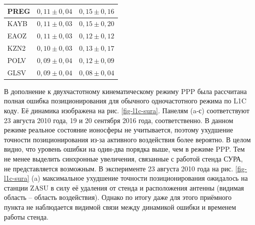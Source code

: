 \begin{longtable}{|>{\centering\arraybackslash}m{4cm}|c|c|}
PREG    & $0,11\pm0,04$                                                                                       & $0,15\pm0,16$                                                                                    \\ \hline
KAYB    & $0,11\pm0,03$                                                                                       & $0,15\pm0,20$                                                                                    \\ \hline
EAOZ    & $0,11\pm0,03$                                                                                       & $0,12\pm0,12$                                                                                    \\ \hline
KZN2    & $0,10\pm0,03$                                                                                       & $0,13\pm0,17$                                                                                    \\ \hline
POLV    & $0,09\pm0,04$                                                                                       & $0,12\pm0,09$                                                                                    \\ \hline
GLSV    & $0,09\pm0,04$                                                                                       & $0,08\pm0,04$                                                                                    \\ \hline
\end{longtable}
\endgroup

В дополнение к двухчастотному кинематическому режиму PPP была рассчитана полная ошибка позиционирования для обычного одночастотного режима по L1C коду. 
Её динамика изображена на рис. \ref{fig-l1c-sura}.
Панелям (a-с) соответствуют 23 августа 2010 года, 19 и 20 сентября 2016 года, соответственно.
В данном режиме реальное состояние ионосферы не учитывается, поэтому ухудшение точности позиционирования из-за активного воздействия более вероятно. 
В целом видно, что уровень ошибки на один-два порядка выше, чем в режиме PPP.
Тем не менее выделить синхронные увеличения, связанные с работой стенда СУРА, не представляется возможным. 
В эксперименте 23 августа 2010 года на рис. \ref{fig-l1c-sura} (a) максимальное ухудшение точности позиционирования ожидалось на станции ZASU в силу её удаления от стенда и расположения антенны (видимая область -- область воздействия).
Однако по итогу даже для этого приёмного пункта не наблюдается видимой связи между динамикой ошибки и временем работы стенда.

